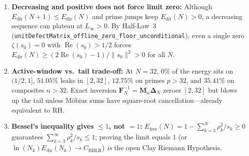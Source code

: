 \documentclass[11pt,a4paper]{article}
\begin{document}
\begin{enumerate}[leftmargin=1.6em]
  \item \textbf{Decreasing and positive does not force limit zero:} Although $E_{\mathrm{dir}}(N+1) \le E_{\mathrm{dir}}(N)$ and prime jumps keep $E_{\mathrm{dir}}(N) > 0$, a decreasing sequence can plateau at $L_\infty > 0$. By Half-Law~3 (\texttt{unitDefectMatrix\_offline\_zero\_floor\_unconditional}), even a single zero $\zeta(s_0)=0$ with $\operatorname{Re}(s_0) > 1/2$ forces $E_{\mathrm{dir}}(N) \ge (2\operatorname{Re}(s_0)-1)/\|s_0\|^2 > 0$ for all $N$.
  \item \textbf{Active-window vs.\ tail trade-off:} At $N=32$, $0\%$ of the energy sits on $(1/2,1]$, $51.05\%$ leaks in $[2,32]$, $12.75\%$ on primes $p > 32$, and $35.41\%$ on composites $n > 32$. Exact inversion $\mathbf{F}_N^{-1}=\mathbf{M}_\mu\mathbf{\Delta}_N$ zeroes $[2,32]$ but blows up the tail unless M\"obius sums have square-root cancellation---already equivalent to RH.
  \item \textbf{Bessel's inequality gives $\le 1$, not $= 1$:} $E_{\mathrm{free}}(N) = 1 - \sum_{k=3}^N \rho_k^2/s_k \ge 0$ guarantees $\sum_{k=3}^\infty \rho_k^2/s_k \le 1$; proving the limit equals $1$ (or $\ln(N_k)E_{\mathrm{dir}}(N_k) \to C_{\mathrm{BBLR}}$) \emph{is} the open Clay Riemann Hypothesis.
\end{enumerate}
\end{document}

